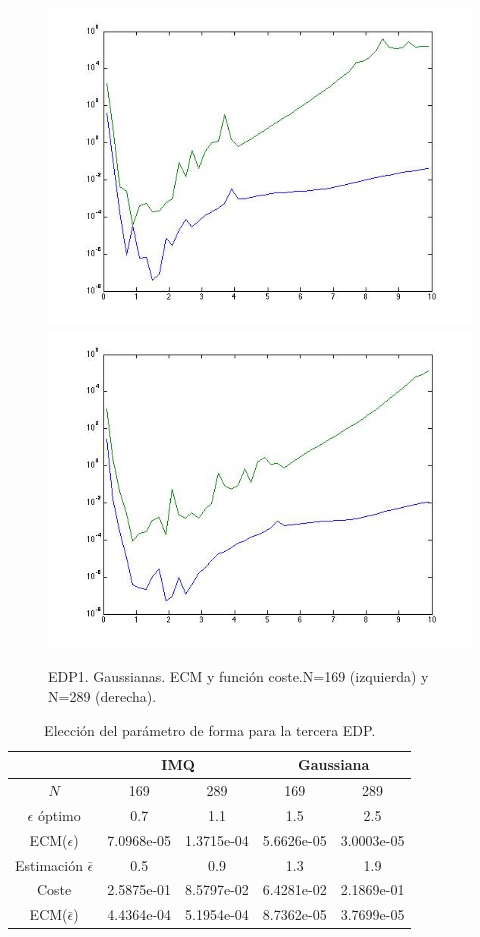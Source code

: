 \documentclass[11pt,a4paper]{article}
\begin{document}
\begin{figure}[H]
\includegraphics[scale=.4]{edp1_169_gaussiana.jpg}
\includegraphics[scale=.4]{edp1_289_gaussiana.jpg}
\caption{EDP1. Gaussianas. ECM y función coste.N=169 (izquierda) y N=289 (derecha).}
\end{figure}
 \begin{table}
 \begin{center}
 \caption{Elección del parámetro de forma para la tercera EDP.}
 \begin{tabular}{|c|c|c|c|c|}
 \hline
  & \multicolumn{2}{|c|}{IMQ} & \multicolumn{2}{|c|}{Gaussiana}\\
  \hline
  $N$& 169 & 289 & 169 & 289 \\
  \hline
  $\epsilon$ óptimo & 0.7 & 1.1 & 1.5 &2.5  \\
  ECM($\epsilon$) &7.0968e-05 & 1.3715e-04& 5.6626e-05 &3.0003e-05 \\
  Estimación $\bar{\epsilon}$ & 0.5 & 0.9& 1.3 & 1.9 \\
  Coste & 2.5875e-01&8.5797e-02 & 6.4281e-02&2.1869e-01 \\
  ECM($\bar{\epsilon}$) &4.4364e-04 &5.1954e-04 &8.7362e-05 &3.7699e-05 \\
  \hline
 
 \end{tabular}
 \end{center}
 \end{table}
\end{document}
